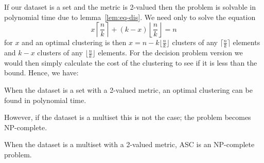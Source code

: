 If our dataset is a set and the metric is 2-valued then the problem is
solvable in polynomial time due to lemma~\ref{lem:eq-dis}.  We need only to
solve the equation
\begin{equation*}
  x \left\lceil\frac{n}{k}\right\rceil
  + (k-x) \left\lfloor\frac{n}{k}\right\rfloor = n
\end{equation*}
for $x$ and an optimal clustering is then $x = n-k\lfloor\frac{n}{k}\rfloor$
clusters of any $\lceil\frac{n}{k}\rceil$ elements and $k-x$ clusters of any
$\lfloor\frac{n}{k}\rfloor$ elements.  For the decision problem version we
would then simply calculate the cost of the clustering to see if it is less
than the bound.  Hence, we have:
\begin{thm}
  When the dataset is a set with a 2-valued metric, an optimal clustering can
  be found in polynomial time.
\end{thm}

However, if the dataset is a multiset this is not the case; the problem
becomes NP-complete.
\begin{thm}
  When the dataset is a multiset with a 2-valued metric, ASC is an NP-complete
  problem.
\end{thm}


